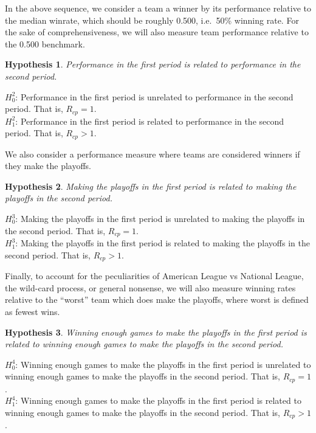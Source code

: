 \documentclass[11pt,]{article}
\newtheorem{hypothesis}{Hypothesis}
\begin{document}
In the above sequence, we consider a team a winner by its performance
relative to the median winrate, which should be roughly 0.500, i.e.~50\%
winning rate. For the sake of comprehensiveness, we will also measure
team performance relative to the 0.500 benchmark.

\begin{framed}
\begin{hypothesis}
Performance in the first period is related to performance in the second period.
\end{hypothesis}

\noindent $H_{0}^2$: Performance in the first period is unrelated to performance in the second period. That is, $R_{cp} = 1$.  \\
$H_{1}^2$: Performance in the first period is related to performance in the second period. That is, $R_{cp} > 1$. 
\end{framed}

We also consider a performance measure where teams are considered
winners if they make the playoffs.

\begin{framed}
\begin{hypothesis}
Making the playoffs in the first period is related to making the playoffs in the second period.
\end{hypothesis}

\noindent $H_{0}^3$: Making the playoffs in the first period is unrelated to making the playoffs in the second period. That is, $R_{cp} = 1$.  \\
$H_{1}^3$: Making the playoffs in the first period is related to making the playoffs in the second period. That is, $R_{cp} > 1$. 
\end{framed}

Finally, to account for the peculiarities of American League vs National
League, the wild-card process, or general nonsense, we will also measure
winning rates relative to the ``worst'' team which does make the
playoffs, where worst is defined as fewest wins.

\begin{framed}
\begin{hypothesis}
Winning enough games to make the playoffs in the first period is related to winning enough games to make the playoffs in the second period.
\end{hypothesis}

\noindent $H_{0}^4$: Winning enough games to make the playoffs in the first period is unrelated to winning enough games to make the playoffs in the second period. That is, $R_{cp} = 1$.  \\
$H_{1}^4$: Winning enough games to make the playoffs in the first period is related to winning enough games to make the playoffs in the second period. That is, $R_{cp} > 1$. 
\end{framed}
\end{document}
